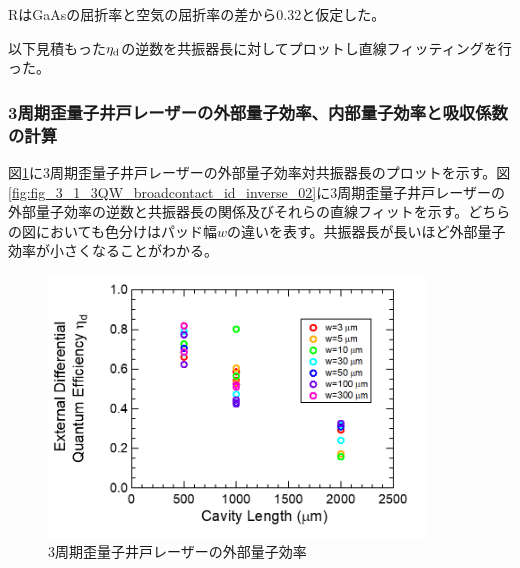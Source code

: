 {{RはGaAsの屈折率と空気の屈折率の差から0.32と仮定した。

以下見積もった$\eta_{\rm{d}}$の逆数を共振器長に対してプロットし直線フィッティングを行った。
\subsubsection{3周期歪量子井戸レーザーの外部量子効率、内部量子効率と吸収係数
の計算}
図\ref{fig:fig_3_1_3QW_broadcontact_id_02}に3周期歪量子井戸レーザーの外部量子効率対共振器長のプロットを示す。図\ref{fig:fig_3_1_3QW_broadcontact_id_inverse_02}に3周期歪量子井戸レーザーの外部量子効率の逆数と共振器長の関係及びそれらの直線フィットを示す。どちらの図においても色分けはパッド幅$w$の違いを表す。共振器長が長いほど外部量子効率が小さくなることがわかる。

\begin{figure}[h]
	\centering
	\includegraphics[width=10cm]{figure/fig_3_1_3QW_broadcontact_id_02.png}
	\caption{3周期歪量子井戸レーザーの外部量子効率}
	\label{fig:fig_3_1_3QW_broadcontact_id_02}
\end{figure}

}}

